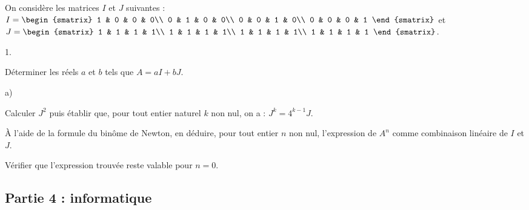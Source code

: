 \noindent
On considère les matrices $I$ et $J$ suivantes : $I =
\begin{smatrix}
  1 & 0 & 0 & 0\\
  0 & 1 & 0 & 0\\
  0 & 0 & 1 & 0\\
  0 & 0 & 0 & 1
\end{smatrix}
$ et $J = 
\begin{smatrix}
  1 & 1 & 1 & 1\\
  1 & 1 & 1 & 1\\
  1 & 1 & 1 & 1\\
  1 & 1 & 1 & 1
\end{smatrix}
$.
\begin{noliste}{1.}
  \setlength{\itemsep}{4mm}%
  \setcounter{enumi}{8}
\item Déterminer les réels $a$ et $b$ tels que $A = aI + bJ$.

  

\item
  \begin{noliste}{a)}
    \setlength{\itemsep}{2mm}
  \item Calculer $J^{2}$ puis établir que, pour tout entier naturel
    $k$ non nul, on a : $J^{k} = 4^{k-1} J$.

    

  \item À l'aide de la formule du binôme de Newton, en déduire, pour
    tout entier $n$ non nul, l'expression de $A^{n}$ comme combinaison
    linéaire de $I$ et $J$.

    

  \item Vérifier que l'expression trouvée reste valable pour $n = 0$.

    
  \end{noliste}
\end{noliste}

\subsection*{Partie 4 : informatique}

